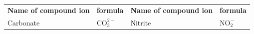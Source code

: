 {{\begin{center}
\begin{xtabular}[t]{|l|l|l|l|}
    
        
                  \textbf{Name of compound ion}
                 &
    
    
        
                  \textbf{formula}
                 &
    
    
        \textbf{Name of compound ion} &
    
    
        \textbf{formula}%
     \tabularnewline{}
    
    
        Carbonate &
    
    
        \begin{math}\mathrm{CO}_{3}^{2-}\end{math} &
    
    
        Nitrite &
    
    
        \begin{math}\mathrm{NO}_{2}^{-}\end{math}%
     \tabularnewline{}
    

\end{xtabular}
\end{center}}}
